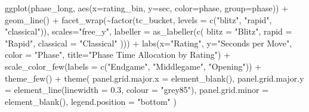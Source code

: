\documentclass[
  12pt]{article}
\newenvironment{Shaded}{\begin{snugshade}}{\end{snugshade}}
\newcommand{\AttributeTok}[1]{\textcolor[rgb]{0.40,0.45,0.13}{#1}}
\newcommand{\FloatTok}[1]{\textcolor[rgb]{0.68,0.00,0.00}{#1}}
\newcommand{\FunctionTok}[1]{\textcolor[rgb]{0.28,0.35,0.67}{#1}}
\newcommand{\NormalTok}[1]{\textcolor[rgb]{0.00,0.23,0.31}{#1}}
\newcommand{\SpecialCharTok}[1]{\textcolor[rgb]{0.37,0.37,0.37}{#1}}
\newcommand{\StringTok}[1]{\textcolor[rgb]{0.13,0.47,0.30}{#1}}
\begin{document}
\begin{Shaded}
\begin{Highlighting}[]
\FunctionTok{ggplot}\NormalTok{(phase\_long, }\FunctionTok{aes}\NormalTok{(}\AttributeTok{x=}\NormalTok{rating\_bin, }\AttributeTok{y=}\NormalTok{sec, }\AttributeTok{color=}\NormalTok{phase, }\AttributeTok{group=}\NormalTok{phase)) }\SpecialCharTok{+}
  \FunctionTok{geom\_line}\NormalTok{() }\SpecialCharTok{+}
  \FunctionTok{facet\_wrap}\NormalTok{(}\SpecialCharTok{\textasciitilde{}}\FunctionTok{factor}\NormalTok{(tc\_bucket, }\AttributeTok{levels =} \FunctionTok{c}\NormalTok{(}\StringTok{"blitz"}\NormalTok{, }\StringTok{"rapid"}\NormalTok{, }\StringTok{"classical"}\NormalTok{)), }\AttributeTok{scales=}\StringTok{"free\_y"}\NormalTok{, }\AttributeTok{labeller =} \FunctionTok{as\_labeller}\NormalTok{(}\FunctionTok{c}\NormalTok{(}
      \AttributeTok{blitz =} \StringTok{"Blitz"}\NormalTok{,}
      \AttributeTok{rapid =} \StringTok{"Rapid"}\NormalTok{,}
      \AttributeTok{classical =} \StringTok{"Classical"}
\NormalTok{    ))) }\SpecialCharTok{+}
  \FunctionTok{labs}\NormalTok{(}\AttributeTok{x=}\StringTok{"Rating"}\NormalTok{, }\AttributeTok{y=}\StringTok{"Seconds per Move"}\NormalTok{, }\AttributeTok{color =} \StringTok{"Phase"}\NormalTok{,}
       \AttributeTok{title=}\StringTok{"Phase Time Allocation by Rating"}\NormalTok{) }\SpecialCharTok{+}
  \FunctionTok{scale\_color\_few}\NormalTok{(}\AttributeTok{labels =} \FunctionTok{c}\NormalTok{(}\StringTok{"Endgame"}\NormalTok{, }\StringTok{"Middlegame"}\NormalTok{, }\StringTok{"Opening"}\NormalTok{)) }\SpecialCharTok{+}
  \FunctionTok{theme\_few}\NormalTok{() }\SpecialCharTok{+} 
  \FunctionTok{theme}\NormalTok{(}
    \AttributeTok{panel.grid.major.x =} \FunctionTok{element\_blank}\NormalTok{(),}
    \AttributeTok{panel.grid.major.y =} \FunctionTok{element\_line}\NormalTok{(}\AttributeTok{linewidth =} \FloatTok{0.3}\NormalTok{, }\AttributeTok{colour =} \StringTok{"grey85"}\NormalTok{),}
    \AttributeTok{panel.grid.minor =} \FunctionTok{element\_blank}\NormalTok{(),}
    \AttributeTok{legend.position =} \StringTok{"bottom"}
\NormalTok{  )}


\end{Highlighting}
\end{Shaded}
\end{document}
